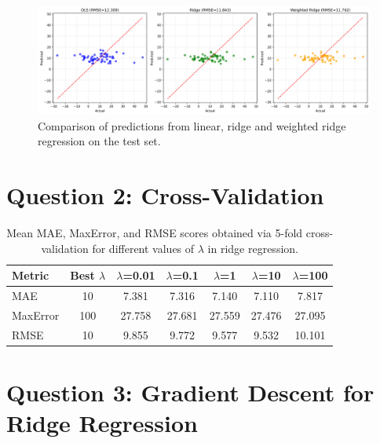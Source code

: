 \documentclass[11pt, a4paper]{article}
\begin{document}
\begin{figure}[H]
\centering
\includegraphics[width=1\textwidth]{./assets/regression_comparison.png}
\caption{Comparison of predictions from linear, ridge and weighted ridge regression on the test set.}
\label{fig:linear_vs_weighted_ridge}
\end{figure}

\section{Question 2: Cross-Validation}

\begin{table}[H]
\centering
\begin{tabular}{|l|c|c|c|c|c|c|}
\hline
\textbf{Metric} & \textbf{Best $\lambda$} & \textbf{$\lambda$=0.01} & \textbf{$\lambda$=0.1} & \textbf{$\lambda$=1} & \textbf{$\lambda$=10} & \textbf{$\lambda$=100} \\
\hline
MAE & 10 & 7.381 & 7.316 & 7.140 & 7.110 & 7.817 \\
\hline
MaxError & 100 & 27.758 & 27.681 & 27.559 & 27.476 & 27.095 \\
\hline
RMSE & 10 & 9.855 & 9.772 & 9.577 & 9.532 & 10.101 \\
\hline
\end{tabular}
\caption{Mean MAE, MaxError, and RMSE scores obtained via 5-fold cross-validation for different values of $\lambda$ in ridge regression.}
\label{tab:cross_validation_results}
\end{table}

\section{Question 3: Gradient Descent for Ridge Regression}
\end{document}
